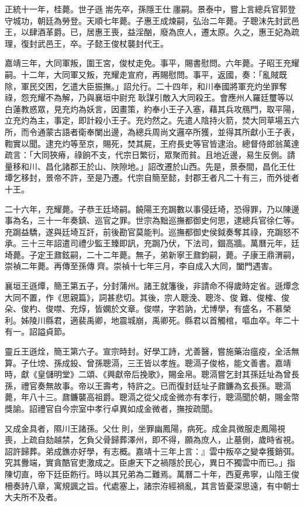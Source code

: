 正統十一年，桂薨。世子遜耑先卒，孫隱王仕廛嗣。景泰中，嘗上言總兵官郭登守城功，朝廷為勞登。天順七年薨。子惠王成煉嗣，弘治二年薨。子聰沫先封武邑王，以肆酒革爵。已，居惠王喪，益淫酗，廢為庶人，遷太原。久之，惠王妃為疏理，復封武邑王，卒。子懿王俊杖襲封代王。

嘉靖三年，大同軍叛，圍王宮，俊杖走免。事平，賜書慰問。六年薨。子昭王充耀嗣。十二年，大同軍又叛，充耀走宣府，再賜慰問。事平，返國，奏：「亂賊既除，軍民交困，乞遣大臣振撫。」詔允行。二十四年，和川奉國將軍充灼坐罪奪祿，怨充耀不為解，乃與襄垣中尉充耿謀引敵入大同殺王。會應州人羅廷璽等以白蓮教惑眾，見充灼為妖言，因畫策，約奉小王子入塞，藉其兵攻鴈門，取平陽，立充灼為主，事定，即計殺小王子。充灼然之。先遣人陰持火箭，焚大同草場五六所，而令通蒙古語者衛奉闌出邊，為總兵周尚文邏卒所獲，並得其所獻小王子表，鞫實以聞。逮充灼等至京，賜死，焚其屍，王府長史等官皆逮治。總督侍郎翁萬達疏言：「大同狹瘠，祿餉不支，代宗日繁衍，眾聚而貧。且地近邊，易生反側。請量移和川、昌化諸郡王於山、陜隙地。」詔改遷於山西。先是，景泰間，昌化王仕墰乞移封，景帝不許，至是乃遷。代宗自簡至懿，封郡王者凡二十有三，而外徙者十王。

二十六年，充耀薨。子恭王廷埼嗣。饒陽王充跼數以事侵廷埼，恐得罪，乃以陳邊事為名，三十一年奏鎮、巡官之罪。世宗為黜巡撫都御史何思，逮總兵官徐仁等。充跼益驕，遂與廷埼互訐，前後勘官莫能判。巡撫都御史侯鉞奏奪其祿，充跼怒不承。三十三年詔遣司禮少監王臻即訊，充跼乃伏，下法司，錮高牆。萬曆元年，廷埼薨。子定王鼐鉉嗣，二十二年薨。無子，弟新寧王鼐鈞嗣，薨。子康王鼎渭嗣，崇禎二年薨。再傳至孫傳齊。崇禎十七年三月，李自成入大同，闔門遇害。

襄垣王遜燂，簡王第五子，分封蒲州。諸王就籓後，非請命不得歲時定省。遜燂念大同不置，作《思親篇》，詞甚悲切。其後，宗人聰浼、聰泈、俊難、俊榷、俊朵、俊杓、俊噤、充焞，皆嫻於文章。俊噤，字若訥，尤博學，有盛名，不慕榮利。姊陵川縣君，適裴禹卿，地震城崩，禹卿死。縣君以首觸棺，嘔血卒。年二十有一。詔謚貞節。

靈丘王遜烇，簡王第六子。宣宗時封。好學工詩，尤善醫，嘗施藥治瘟疫，全活無算。子仕塝、孫成鈠、曾孫聰滆，三王皆以孝旌。聰滆子俊格，能文善書。嘉靖時，獻《皇儲明堂》二頌、《興獻帝后挽歌》，賜金帛。聰滆嘗乞封其孫廷址為曾長孫，禮官奏無故事。帝以王壽考，特許之。已而復封廷址子鼐鐮為玄長孫。聰滆薨，年八十三。鼐鐮襲高祖爵。聰滆之從父成金微亦有孝行，聰滆聞於朝，賜金幣獎諭。詔禮官自今宗室中孝行卓異如成金微者，撫按疏聞。

又成金具者，隰川王諸孫。父仕則，坐罪幽鳳陽，病死。成金具微服走鳳陽視喪，上疏自劾越禁，乞負父骨歸葬澤州，即不得，願為庶人，止墓側，歲時省視。詔許歸葬。弟成鐎亦好學，有志概。嘉靖十三年上言：』雲中叛卒之變幸獲銷弭。究其釁端，實貪酷官吏激成之。臣慮天下之禍隱於民心，異日不獨雲中而已。」指陳切直，帝下廷臣飭行。時以其兄弟為二難焉。萬曆二十年，西夏弗寧，山陰王俊柵奏詩八章，寓規諷之旨。代處塞上，諸宗洊經禍亂，其言皆憂深思遠，有中朝士大夫所不及者。

